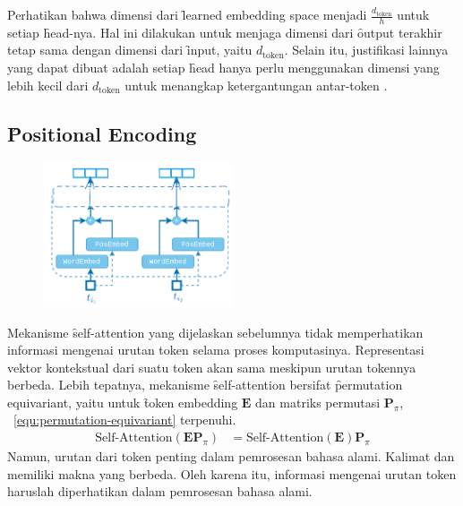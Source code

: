 	Perhatikan bahwa dimensi dari \f{learned embedding space} menjadi $\frac{d_{\text{token}}}{h}$ untuk setiap \f{head}-nya. Hal ini dilakukan untuk menjaga dimensi dari \f{output} terakhir tetap sama dengan dimensi dari \f{input}, yaitu $d_{\text{token}}$. Selain itu, justifikasi lainnya yang dapat dibuat adalah setiap \f{head} hanya perlu menggunakan dimensi yang lebih kecil dari $d_{\text{token}}$ untuk menangkap ketergantungan antar-token \citep{pi-tau2023transformer}.

	\subsection{\f{Positional Encoding}}
	\label{sec:positional-encoding}

	\begin{figure}
		\centering
		\includegraphics[width=0.5\textwidth]{assets/pics/positional_encoding.png}
		\label{fig:positional-encoding}
	\end{figure}


	Mekanisme \f{self-attention} yang dijelaskan sebelumnya tidak memperhatikan informasi mengenai urutan token selama proses komputasinya. Representasi vektor kontekstual dari suatu token akan sama meskipun urutan tokennya berbeda. Lebih tepatnya, mekanisme \f{self-attention} bersifat \f{permutation equivariant}, yaitu untuk \f{token embedding} $\mathbf{E}$ dan matriks permutasi $\mathbf{P}_{\pi}$, \equ~\ref{equ:permutation-equivariant} terpenuhi.
	\begin{align}
	\label{equ:permutation-equivariant}
	\text{Self-Attention}(\mathbf{EP}_{\pi}) &= \text{Self-Attention}(\mathbf{E})\mathbf{P}_{\pi}
	\end{align}
	Namun, urutan dari token penting dalam pemrosesan bahasa alami. Kalimat  dan  memiliki makna yang berbeda. Oleh karena itu, informasi mengenai urutan token haruslah diperhatikan dalam pemrosesan bahasa alami.
	
